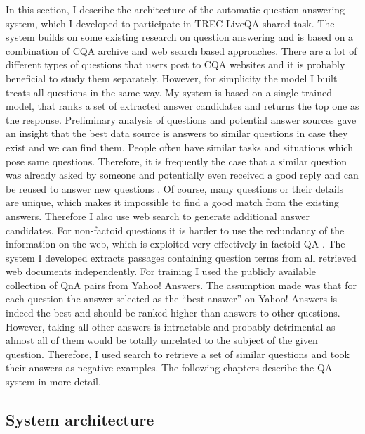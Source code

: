 
In this section, I describe the architecture of the automatic question answering system, which I developed to participate in TREC LiveQA shared task.
The system builds on some existing research on question answering and is based on a combination of CQA archive and web search based approaches.
There are a lot of different types of questions that users post to CQA websites and it is probably beneficial to study them separately.
However, for simplicity the model I built treats all questions in the same way.
My system is based on a single trained model, that ranks a set of extracted answer candidates and returns the top one as the response.
Preliminary analysis of questions and potential answer sources gave an insight that the best data source is answers to similar questions in case they exist and we can find them.
People often have similar tasks and situations which pose same questions.
Therefore, it is frequently the case that a similar question was already asked by someone and potentially even received a good reply and can be reused to answer new questions \cite{Shtok:2012:LPA:2187836.2187939}.
Of course, many questions or their details are unique, which makes it impossible to find a good match from the existing answers.
Therefore I also use web search to generate additional answer candidates.
For non-factoid questions it is harder to use the redundancy of the information on the web, which is exploited very effectively in factoid QA \cite{lin2007exploration}.
The system I developed extracts passages containing question terms from all retrieved web documents independently.
For training I used the publicly available collection of QnA pairs from Yahoo! Answers.
The assumption made was that for each question the answer selected as the ``best answer'' on Yahoo! Answers is indeed the best and should be ranked higher than answers to other questions.
However, taking all other answers is intractable and probably detrimental as almost all of them would be totally unrelated to the subject of the given question.
Therefore, I used search to retrieve a set of similar questions and took their answers as negative examples.
The following chapters describe the QA system in more detail.

\subsection{System architecture}
\label{section:non-factoid:liveqa:architecture}

